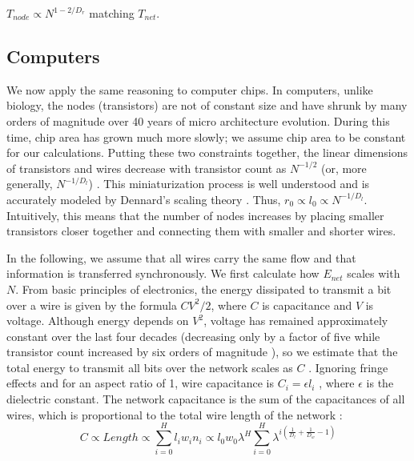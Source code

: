 \documentclass[12pt]{article}
\begin{document}
$T_{node} \propto N^{1-2/D_r}$ matching $T_{net}$. 



\subsection{Computers}
\label{sec:computers}

We now apply the same reasoning to computer chips. 
In computers, unlike biology, the nodes (transistors) 
are not of constant size and have shrunk by many orders of magnitude over
40 years of micro architecture evolution.  During this time,
chip area has grown much more slowly; we assume chip area to be constant for our calculations.
Putting these two constraints together, the linear 
dimensions of transistors and wires decrease with transistor count as 
$N^{-1/2}$ (or, more generally, $N^{-1/D_l}$) \cite{moses08}.  This 
miniaturization process is well understood and is accurately modeled 
by Dennard's scaling theory \cite{dennard74}.  
Thus, $r_0 \propto l_0 \propto N^{-1/D_l}$. Intuitively, this means that the number of nodes increases by placing smaller transistors closer together and connecting them with smaller and shorter wires.

In the following, 
we assume that all wires carry the same flow and that information is 
transferred synchronously. We first calculate how $E_{net}$ scales with $N$. From basic principles of electronics, the 
energy dissipated to transmit a bit over a wire is given by the 
formula $CV^2/2$, where $C$ is capacitance and $V$ is voltage.  
Although energy depends on $V^2$, voltage has remained approximately 
constant over the last four decades (decreasing only by a factor of 
five while transistor count increased by six orders of magnitude 
\cite{ning07}), so we estimate that the total energy to transmit all bits over the network scales as $C$ 
\cite{bingham08}.  Ignoring fringe effects and for an aspect ratio of 
1, wire capacitance is $C_i = \epsilon l_i$ \cite{wilhelm95}, where 
$\epsilon$ is the dielectric constant.  The network capacitance is the 
sum of the capacitances of all wires, which is proportional to the 
total wire length of the network \cite{donath79}:
\begin{equation}
C \propto Length \propto  \sum_{i=0}^H l_i w_i n_i \propto
 l_0 w_0 \lambda^H \sum_{i=0}^H \lambda^{i \left( 
\frac{1}{D_l} + \frac{1}{D_w} -1 \right)}
\end{equation}
\end{document}
